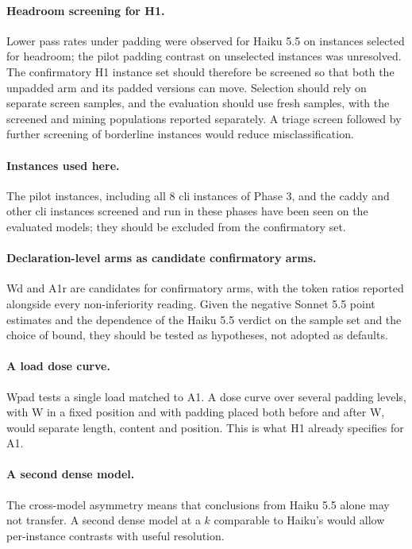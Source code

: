 \paragraph{Headroom screening for H1.} Lower pass rates under padding were observed for Haiku 5.5 on instances selected for headroom; the pilot padding contrast on unselected instances was unresolved. The confirmatory H1 instance set should therefore be screened so that both the unpadded arm and its padded versions can move. Selection should rely on separate screen samples, and the evaluation should use fresh samples, with the screened and mining populations reported separately. A triage screen followed by further screening of borderline instances would reduce misclassification.

\paragraph{Instances used here.} The pilot instances, including all 8 cli instances of Phase 3, and the caddy and other cli instances screened and run in these phases have been seen on the evaluated models; they should be excluded from the confirmatory set.

\paragraph{Declaration-level arms as candidate confirmatory arms.} Wd and A1r are candidates for confirmatory arms, with the token ratios reported alongside every non-inferiority reading. Given the negative Sonnet 5.5 point estimates and the dependence of the Haiku 5.5 verdict on the sample set and the choice of bound, they should be tested as hypotheses, not adopted as defaults.

\paragraph{A load dose curve.} Wpad tests a single load matched to A1. A dose curve over several padding levels, with W in a fixed position and with padding placed both before and after W, would separate length, content and position. This is what H1 already specifies for A1.

\paragraph{A second dense model.} The cross-model asymmetry means that conclusions from Haiku 5.5 alone may not transfer. A second dense model at a $k$ comparable to Haiku's would allow per-instance contrasts with useful resolution.

